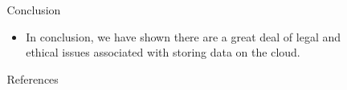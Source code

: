 \documentclass[final]{beamer}
\newlength{\sepwid}
\newlength{\onecolwid}
\newlength{\twocolwid}
\begin{document}
\begin{frame}[t]
\begin{columns}[t]
\begin{column}{\twocolwid}
\begin{columns}[t,totalwidth=\twocolwid]
\begin{column}{\onecolwid}
\end{column} %

\begin{column}{\onecolwid} %


\end{column} %

\end{columns} %

\end{column} %

\begin{column}{\sepwid}\end{column} %

\begin{column}{\onecolwid} %


\begin{alertblock}{Conclusion}
\begin{itemize}
\item In conclusion, we have shown there are a great deal of legal and ethical issues associated with storing data on the cloud.
\end{itemize}
\end{alertblock}


\begin{block}{References}

\nocite{*} %
\small{
\vspace{0.75in}}

\end{block}


\end{column} %

\end{columns} %

\end{frame} %
\end{document}
